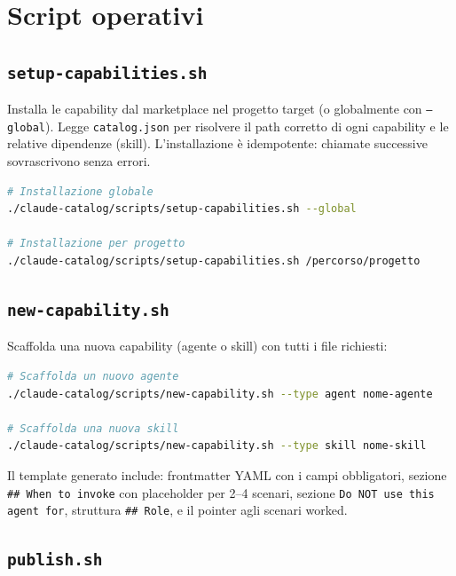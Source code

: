 \documentclass[12pt,a4paper,twoside]{book}
\begin{document}
\chapter{Script operativi}

\section{\texttt{setup-capabilities.sh}}

Installa le capability dal marketplace nel progetto target (o globalmente con \texttt{--global}). Legge \texttt{catalog.json} per risolvere il path corretto di ogni capability e le relative dipendenze (skill). L'installazione è idempotente: chiamate successive sovrascrivono senza errori.

\begin{lstlisting}[language=bash]
# Installazione globale
./claude-catalog/scripts/setup-capabilities.sh --global

# Installazione per progetto
./claude-catalog/scripts/setup-capabilities.sh /percorso/progetto
\end{lstlisting}

\section{\texttt{new-capability.sh}}

Scaffolda una nuova capability (agente o skill) con tutti i file richiesti:

\begin{lstlisting}[language=bash]
# Scaffolda un nuovo agente
./claude-catalog/scripts/new-capability.sh --type agent nome-agente

# Scaffolda una nuova skill
./claude-catalog/scripts/new-capability.sh --type skill nome-skill
\end{lstlisting}

Il template generato include: frontmatter YAML con i campi obbligatori, sezione \texttt{\#\# When to invoke} con placeholder per 2--4 scenari, sezione \texttt{Do NOT use this agent for}, struttura \texttt{\#\# Role}, e il pointer agli scenari worked.

\section{\texttt{publish.sh}}
\end{document}
